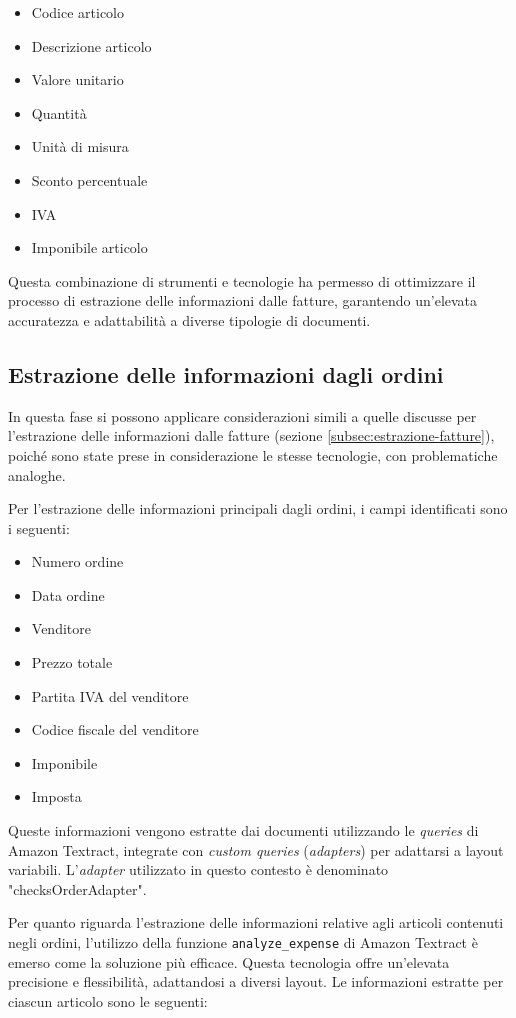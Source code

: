 \begin{itemize}
    \item Codice articolo
    \item Descrizione articolo
    \item Valore unitario
    \item Quantità
    \item Unità di misura
    \item Sconto percentuale
    \item IVA
    \item Imponibile articolo
\end{itemize}

Questa combinazione di strumenti e tecnologie ha permesso di ottimizzare il processo di estrazione delle informazioni dalle fatture, garantendo un'elevata accuratezza e adattabilità a diverse tipologie di documenti.


\subsection{Estrazione delle informazioni dagli ordini}
In questa fase si possono applicare considerazioni simili a quelle discusse per l'estrazione delle informazioni dalle fatture (sezione \ref{subsec:estrazione-fatture}), poiché sono state prese in considerazione le stesse tecnologie, con problematiche analoghe.

Per l'estrazione delle informazioni principali dagli ordini, i campi identificati sono i seguenti:

\begin{itemize}
    \item Numero ordine
    \item Data ordine
    \item Venditore
    \item Prezzo totale
    \item Partita IVA del venditore
    \item Codice fiscale del venditore
    \item Imponibile
    \item Imposta
\end{itemize}

Queste informazioni vengono estratte dai documenti utilizzando le \textit{queries} di Amazon Textract, integrate con \textit{custom queries} (\textit{adapters}) per adattarsi a layout variabili. L'\textit{adapter} utilizzato in questo contesto è denominato "checksOrderAdapter".

Per quanto riguarda l'estrazione delle informazioni relative agli articoli contenuti negli ordini, l'utilizzo della funzione \texttt{analyze\_expense} di Amazon Textract è emerso come la soluzione più efficace. Questa tecnologia offre un'elevata precisione e flessibilità, adattandosi a diversi layout. Le informazioni estratte per ciascun articolo sono le seguenti:

